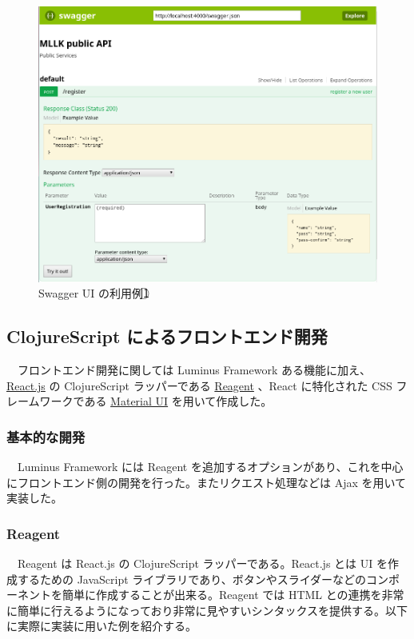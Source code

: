 \documentclass{scrartcl}
\begin{document}
\begin{figure}[htbp]
\centering
\includegraphics[width=15cm]{./swagger-ui-view2.PNG}
\caption{Swagger UI の利用例\textcircled{\scriptsize 1}}
\end{figure}
\newpage
\subsection{ClojureScript によるフロントエンド開発}
\label{sec:orgbeb4cc4}
　フロントエンド開発に関しては Luminus Framework ある機能に加え、 \href{https://reactjs.org/}{React.js} の ClojureScript ラッパーである \href{https://reagent-project.github.io/}{Reagent} 、React に特化された CSS フレームワークである \href{http://www.material-ui.com/\#/}{Material UI} を用いて作成した。\\
\subsubsection{基本的な開発}
\label{sec:org88ef76b}
　Luminus Framework には Reagent を追加するオプションがあり、これを中心にフロントエンド側の開発を行った。またリクエスト処理などは Ajax を用いて実装した。\\
\subsubsection{Reagent}
\label{sec:orgad36b7b}
　Reagent は React.js の ClojureScript ラッパーである。React.js とは UI を作成するための JavaScript ライブラリであり、ボタンやスライダーなどのコンポーネントを簡単に作成することが出来る。Reagent では HTML との連携を非常に簡単に行えるようになっており非常に見やすいシンタックスを提供する。以下に実際に実装に用いた例を紹介する。\\
\end{document}

